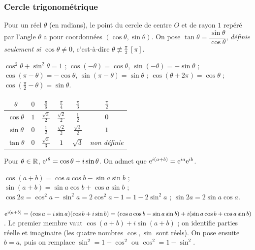 \subsubsection*{Cercle trigonométrique}
\begin{definition}
Pour un réel $\theta$ (en radians), le point du cercle de centre $O$ et de rayon $1$ repéré par l'angle $\theta$ a pour coordonnées $(\cos\theta,\sin\theta)$. On pose $\tan\theta=\dfrac{\sin\theta}{\cos\theta}$, \emph{définie seulement si $\cos\theta\ne0$}, c'est-à-dire $\theta\not\equiv\frac\pi2\ [\pi]$.
\end{definition}
\begin{propriete}
$\cos^2\theta+\sin^2\theta=1$ ; $\cos(-\theta)=\cos\theta$, $\sin(-\theta)=-\sin\theta$ ; $\cos(\pi-\theta)=-\cos\theta$, $\sin(\pi-\theta)=\sin\theta$ ; $\cos(\theta+2\pi)=\cos\theta$ ; $\cos(\tfrac\pi2-\theta)=\sin\theta$.
\end{propriete}
\begin{center}\begin{tabular}{c|ccccc}
$\theta$ & $0$ & $\frac\pi6$ & $\frac\pi4$ & $\frac\pi3$ & $\frac\pi2$\\ \hline
$\cos\theta$ & $1$ & $\frac{\sqrt3}2$ & $\frac{\sqrt2}2$ & $\frac12$ & $0$\\
$\sin\theta$ & $0$ & $\frac12$ & $\frac{\sqrt2}2$ & $\frac{\sqrt3}2$ & $1$\\
$\tan\theta$ & $0$ & $\frac{\sqrt3}3$ & $1$ & $\sqrt3$ & \textit{non définie}
\end{tabular}\end{center}
\begin{definition}
Pour $\theta\in\mathbb{R}$, $\mathrm{e}^{i\theta}=\cos\theta+i\sin\theta$. On admet que $\mathrm{e}^{i(a+b)}=\mathrm{e}^{ia}\mathrm{e}^{ib}$.
\end{definition}
\begin{propriete}
$\cos(a+b)=\cos a\cos b-\sin a\sin b$ ; $\sin(a+b)=\sin a\cos b+\cos a\sin b$ ; $\cos2a=\cos^2a-\sin^2a=2\cos^2a-1=1-2\sin^2a$ ; $\sin2a=2\sin a\cos a$.
\end{propriete}
\begin{demonstration}
$\mathrm{e}^{i(a+b)}=(\cos a+i\sin a)(\cos b+i\sin b)=(\cos a\cos b-\sin a\sin b)+i(\sin a\cos b+\cos a\sin b)$. Le premier membre vaut $\cos(a+b)+i\sin(a+b)$ ; on identifie parties réelle et imaginaire (les quatre nombres $\cos,\sin$ sont réels). On pose ensuite $b=a$, puis on remplace $\sin^2=1-\cos^2$ ou $\cos^2=1-\sin^2$.
\end{demonstration}

